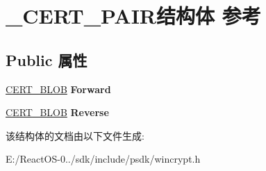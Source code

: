 \hypertarget{struct___c_e_r_t___p_a_i_r}{}\section{\+\_\+\+C\+E\+R\+T\+\_\+\+P\+A\+I\+R结构体 参考}
\label{struct___c_e_r_t___p_a_i_r}
\subsection*{Public 属性}
\begin{DoxyCompactItemize}
\item 
\mbox{\label{struct___c_e_r_t___p_a_i_r_a4f97c5b74e38a2f7f510289e63e4ace9}} 
\hyperlink{struct___c_r_y_p_t_o_a_p_i___b_l_o_b}{C\+E\+R\+T\+\_\+\+B\+L\+OB} {\bfseries Forward}
\item 
\mbox{\label{struct___c_e_r_t___p_a_i_r_aae9191080f096b58199c5d8c5cf0de7a}} 
\hyperlink{struct___c_r_y_p_t_o_a_p_i___b_l_o_b}{C\+E\+R\+T\+\_\+\+B\+L\+OB} {\bfseries Reverse}
\end{DoxyCompactItemize}


该结构体的文档由以下文件生成\+:\begin{DoxyCompactItemize}
\item 
E\+:/\+React\+O\+S-\/0../sdk/include/psdk/wincrypt.\+h\end{DoxyCompactItemize}
